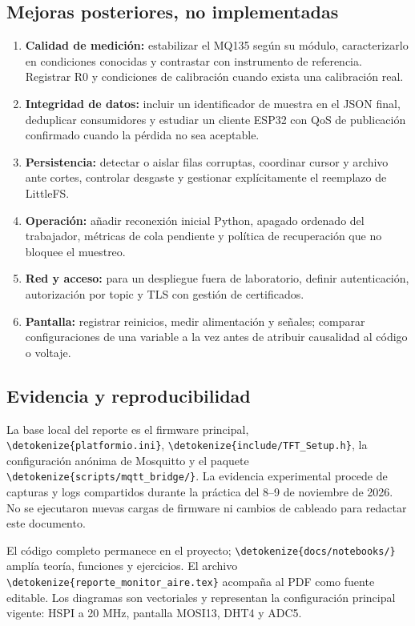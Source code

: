 \documentclass[11pt,a4paper]{article}
\newcommand{\code}[1]{\expandafter\nolinkurl\expandafter{\detokenize{#1}}}
\begin{document}
\subsection{Mejoras posteriores, no implementadas}
\begin{enumerate}
\setlength\itemsep{2pt}
\item \textbf{Calidad de medición:} estabilizar el MQ135 según su módulo, caracterizarlo en condiciones conocidas y contrastar con instrumento de referencia. Registrar R0 y condiciones de calibración cuando exista una calibración real.
\item \textbf{Integridad de datos:} incluir un identificador de muestra en el JSON final, deduplicar consumidores y estudiar un cliente ESP32 con QoS de publicación confirmado cuando la pérdida no sea aceptable.
\item \textbf{Persistencia:} detectar o aislar filas corruptas, coordinar cursor y archivo ante cortes, controlar desgaste y gestionar explícitamente el reemplazo de LittleFS.
\item \textbf{Operación:} añadir reconexión inicial Python, apagado ordenado del trabajador, métricas de cola pendiente y política de recuperación que no bloquee el muestreo.
\item \textbf{Red y acceso:} para un despliegue fuera de laboratorio, definir autenticación, autorización por topic y TLS con gestión de certificados.
\item \textbf{Pantalla:} registrar reinicios, medir alimentación y señales; comparar configuraciones de una variable a la vez antes de atribuir causalidad al código o voltaje.
\end{enumerate}

\subsection{Evidencia y reproducibilidad}
La base local del reporte es el firmware principal, \code{platformio.ini}, \code{include/TFT_Setup.h}, la configuración anónima de Mosquitto y el paquete \code{scripts/mqtt_bridge/}. La evidencia experimental procede de capturas y logs compartidos durante la práctica del 8--9 de noviembre de 2026. No se ejecutaron nuevas cargas de firmware ni cambios de cableado para redactar este documento.

El código completo permanece en el proyecto; \code{docs/notebooks/} amplía teoría, funciones y ejercicios. El archivo \code{reporte_monitor_aire.tex} acompaña al PDF como fuente editable. Los diagramas son vectoriales y representan la configuración principal vigente: HSPI a 20 MHz, pantalla MOSI13, DHT4 y ADC5.
\end{document}
